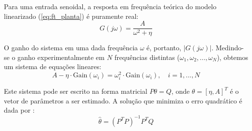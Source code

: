 Para uma entrada senoidal, a resposta em frequência teórica do modelo linearizado (\ref{eq:ft_planta}) é puramente real:
\begin{equation}
    G(j\omega) = \frac{A}{\omega^{2} + \eta}
\end{equation}

O ganho do sistema em uma dada frequência $\omega$ é, portanto, $|G(j\omega)|$. Medindo-se o ganho experimentalmente em $N$ frequências distintas ($\omega_1, \omega_2, ..., \omega_N$), obtemos um sistema de equações lineares:
\begin{equation}
    A - \eta \cdot \text{Gain}(\omega_i) = \omega_i^2 \cdot \text{Gain}(\omega_i), \quad i=1,...,N
\end{equation}

Este sistema pode ser escrito na forma matricial $P\theta = Q$, onde $\theta = [\eta, A]^T$ é o vetor de parâmetros a ser estimado. A solução que minimiza o erro quadrático é dada por \cite{kawakami2003}:
\begin{equation}
    \hat{\theta} = (P^T P)^{-1} P^T Q
\end{equation}